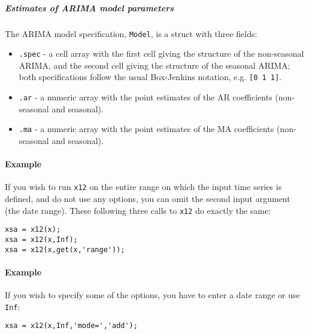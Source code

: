 \subparagraph{Estimates of ARIMA model
parameters}

The ARIMA model specification, \texttt{Model}, is a struct with three
fields:

\begin{itemize}
\item
  \texttt{.spec} - a cell array with the first cell giving the structure
  of the non-seasonal ARIMA, and the second cell giving the structure of
  the seasonal ARIMA; both specifications follow the usual Box-Jenkins
  notation, e.g. \texttt{{[}0 1 1{]}}.
\item
  \texttt{.ar} - a numeric array with the point estimates of the AR
  coefficients (non-seasonal and seasonal).
\item
  \texttt{.ma} - a numeric array with the point estimates of the MA
  coefficients (non-seasonal and seasonal).
\end{itemize}

\paragraph{Example}

If you wish to run \texttt{x12} on the entire range on which the input
time series is defined, and do not use any options, you can omit the
second input argument (the date range). These following three calls to
\texttt{x12} do exactly the same:

\begin{verbatim}
xsa = x12(x);
xsa = x12(x,Inf);
xsa = x12(x,get(x,'range'));
\end{verbatim}

\paragraph{Example}

If you wish to specify some of the options, you have to enter a date
range or use \texttt{Inf}:

\begin{verbatim}
xsa = x12(x,Inf,'mode=','add');
\end{verbatim}


